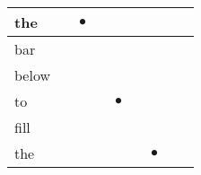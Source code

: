 \documentclass[landscape]{article}
\newcommand{\ssp}{\hspace{2pt}}
\newcommand{\mex}{\cellcolor{g}$\bullet$}
\begin{document}
\begin{tabular}{|l|p{10pt}|p{10pt}|p{10pt}|p{10pt}|p{10pt}|p{10pt}|p{10pt}|p{10pt}|}
\hline
\ssp \cellcolor{ref1}the \ssp&\hspace{2pt}&\hspace{2pt}\mex&\hspace{2pt}&\hspace{2pt}&\hspace{2pt}&\hspace{2pt}&\hspace{2pt}&\hspace{2pt}\\
\hline
\ssp bar \ssp&\hspace{2pt}&\hspace{2pt}&\hspace{2pt}&\hspace{2pt}&\hspace{2pt}&\hspace{2pt}&\hspace{2pt}&\hspace{2pt}\\
\hline
\ssp below \ssp&\hspace{2pt}&\hspace{2pt}&\hspace{2pt}&\hspace{2pt}&\hspace{2pt}&\hspace{2pt}&\hspace{2pt}&\hspace{2pt}\\
\hline
\ssp \cellcolor{ref3}to \ssp&\hspace{2pt}&\hspace{2pt}&\hspace{2pt}&\hspace{2pt}\mex&\hspace{2pt}&\hspace{2pt}&\hspace{2pt}&\hspace{2pt}\\
\hline
\ssp fill \ssp&\hspace{2pt}&\hspace{2pt}&\hspace{2pt}&\hspace{2pt}&\hspace{2pt}&\hspace{2pt}&\hspace{2pt}&\hspace{2pt}\\
\hline
\ssp \cellcolor{ref5}the \ssp&\hspace{2pt}&\hspace{2pt}&\hspace{2pt}&\hspace{2pt}&\hspace{2pt}&\hspace{2pt}\mex&\hspace{2pt}&\hspace{2pt}\\

\end{tabular}
\end{document}
